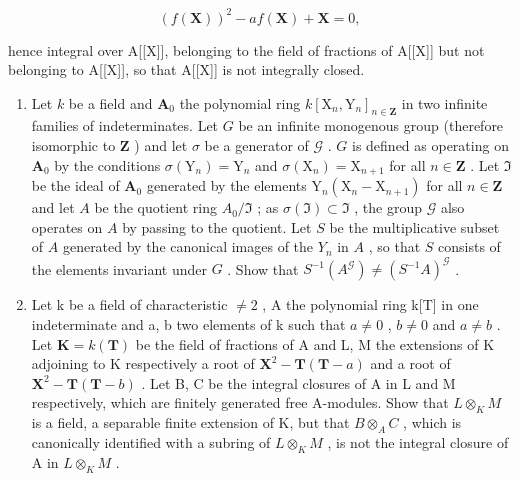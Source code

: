 \[
(f (\mathbf {X})) ^ {2} - a f (\mathbf {X}) + \mathbf {X} = 0,
\]

hence integral over A{[}{[}X{]}{]}, belonging to the field of fractions of A{[}{[}X{]}{]} but not belonging to A{[}{[}X{]}{]}, so that A{[}{[}X{]}{]} is not integrally closed.

\begin{enumerate}
\def\labelenumi{\arabic{enumi}.}
\setcounter{enumi}{27}
\item
  Let \(k\) be a field and \(\mathbf{A}_0\) the polynomial ring \(k[\mathrm{X}_n, \mathrm{Y}_n]_{n \in \mathbf{Z}}\) in two infinite families of indeterminates. Let \(G\) be an infinite monogenous group (therefore isomorphic to \(\mathbf{Z}\) ) and let \(\sigma\) be a generator of \(\mathcal{G}\) . \(G\) is defined as operating on \(\mathbf{A}_0\) by the conditions \(\sigma(\mathrm{Y}_n) = \mathrm{Y}_n\) and \(\sigma(\mathrm{X}_n) = \mathrm{X}_{n+1}\) for all \(n \in \mathbf{Z}\) . Let \(\Im\) be the ideal of \(\mathbf{A}_0\) generated by the elements \(\mathrm{Y}_n(\mathrm{X}_n - \mathrm{X}_{n+1})\) for all \(n \in \mathbf{Z}\) and let \(A\) be the quotient ring \(A_0 / \Im\) ; as \(\sigma(\Im) \subset \Im\) , the group \(\mathcal{G}\) also operates on \(A\) by passing to the quotient. Let \(S\) be the multiplicative subset of \(A\) generated by the canonical images of the \(Y_n\) in \(A\) , so that \(S\) consists of the elements invariant under \(G\) . Show that \(S^{-1}(A^{\mathcal{G}}) \neq (S^{-1}A)^{\mathcal{G}}\) .
\item
  Let k be a field of characteristic \(\neq2\) , A the polynomial ring k{[}T{]} in one indeterminate and a, b two elements of k such that \(a\neq0\) , \(b\neq0\) and \(a\neq b\) . Let \(\mathbf{K}=k(\mathbf{T})\) be the field of fractions of A and L, M the extensions of K adjoining to K respectively a root of \(\mathbf{X}^{2}-\mathbf{T}(\mathbf{T}-a)\) and a root of \(\mathbf{X}^{2}-\mathbf{T}(\mathbf{T}-b)\) . Let B, C be the integral closures of A in L and M respectively, which are finitely generated free A-modules. Show that \(L\otimes_{K}M\) is a field, a separable finite extension of K, but that \(B\otimes_{A}C\) , which is canonically identified with a subring of \(L\otimes_{K}M\) , is not the integral closure of A in \(L\otimes_{K}M\) .
\end{enumerate}

